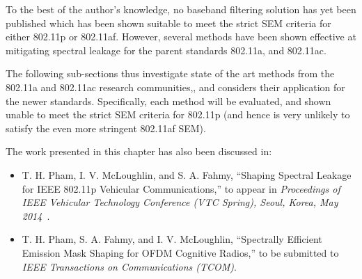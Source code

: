 To the best of the author's knowledge, no baseband filtering solution has yet been published which has been shown suitable to meet the strict SEM criteria for either 802.11p or 802.11af.
However, several methods have been shown effective at mitigating spectral leakage for the parent standards 802.11a, and 802.11ac.

The following sub-sections thus investigate state of the art methods from the 802.11a and 802.11ac research communities,, and considers their application for the newer standards.
Specifically, each method will be evaluated, and shown unable to meet the strict SEM criteria for 802.11p (and hence is very unlikely to satisfy the even more stringent 802.11af SEM). 

The work presented in this chapter has also been discussed in:
\begin{itemize}
\item  T. H. Pham, I. V. McLoughlin, and S. A. Fahmy, ``Shaping Spectral Leakage for IEEE 802.11p Vehicular Communications,'' to appear in \textit{Proceedings of IEEE Vehicular Technology Conference (VTC Spring), Seoul, Korea, May 2014}~\cite{PhamMay2014}.
\item T. H. Pham, S. A. Fahmy, and I. V. McLoughlin, ``Spectrally Efficient Emission Mask Shaping for OFDM Cognitive Radios,''  to be submitted to \textit{IEEE Transactions on Communications (TCOM)}.
\end{itemize}

